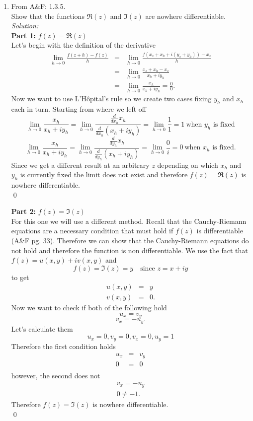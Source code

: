 \documentclass[10pt]{amsart}
\theoremstyle{nonumberplain}
\begin{document}
\begin{enumerate}[label={\bf {\arabic*}:}]
\item From A\&F: 1.3.5.\\
Show that the functions $\Re(z)$ and $\Im(z)$ are nowhere differentiable. \\
\textit{Solution:} \\
\textbf{Part 1:} $f(z) = \Re(z)$ \\
Let's begin with the definition of the derivative 
\begin{eqnarray*}
\lim_{h \rightarrow 0} \frac{f(z + h) - f(z)}{h} &=& \lim_{h \rightarrow 0} \frac{f(x_z + x_h + i (y_z + y_h) ) - x_z}{h} \\
								 &=& \lim_{h \rightarrow 0} \frac{x_z + x_h - x_z}{x_h + iy_h} \\
								 &=& \lim_{h \rightarrow 0} \frac{x_h}{x_h + iy_h} = \frac{0}{0}.						
\end{eqnarray*}
Now we want to use L'Hôpital's rule so we create two cases fixing $y_h$ and $x_h$ each in turn.
Starting from where we left off
$$ \lim_{h \rightarrow 0} \frac{x_h}{x_h + iy_h} = \lim_{h \rightarrow 0} \frac{ \frac{d}{dx_h}x_h}{\frac{d}{dx_h}(x_h + iy_h)} = \lim_{h \rightarrow 0} \frac{1}{1} = 1 \: \text{when $y_h$ is fixed} $$
$$ \lim_{h \rightarrow 0} \frac{x_h}{x_h + iy_h} = \lim_{h \rightarrow 0} \frac{ \frac{d}{dy_h}x_h}{\frac{d}{dy_h}(x_h + iy_h)} = \lim_{h \rightarrow 0} \frac{0}{i} = 0 \: \text{when $x_h$ is fixed}. $$
Since we get a different result at an arbitrary $z$ depending on which $x_h$ and $y_h$ is currently fixed the limit does not exist and therefore $f(z) = \Re(z)$ is nowhere differentiable. \\
\qed

\noindent
\textbf{Part 2:} $f(z) = \Im(z)$ \\
For this one we will use a different method. Recall that the Cauchy-Riemann equations are a necessary condition that must hold if $f(z)$ is differentiable (A\&F pg. 33). Therefore we can show that the Cauchy-Riemann equations do not hold and therefore the function is non differentiable. We use the fact that $f(z) = u(x, y) + i v(x, y)$ and 
$$f(z) = \Im(z) = y \quad\text{since $z = x +iy$}$$
to get 
\begin{eqnarray*}
u(x, y) &=& y \\
v(x, y) &=& 0.
\end{eqnarray*}
Now we want to check if both of the following hold
$$u_x = v_y$$
$$v_x = - u_y.$$
Let's calculate them
$$u_x = 0, v_y = 0, v_x = 0, u_y = 1$$
Therefore the first condition holds
\begin{eqnarray*}
u_x &=& v_y \\
0 &=& 0 \\
\end{eqnarray*}
however, the second does not
\begin{eqnarray*}
v_x = - u_y \\
0 \neq - 1.
\end{eqnarray*}
Therefore $f(z) = \Im(z)$ is nowhere differentiable. \\
\qed


\end{enumerate}
\end{document}
